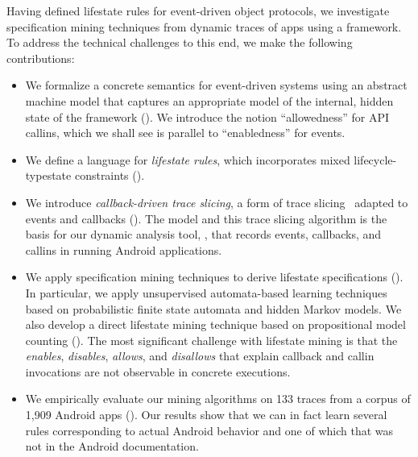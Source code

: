 \documentclass[10pt,reprint,nocopyrightspace,numbers]{sigplanconf}
\begin{document}

Having defined lifestate rules for event-driven object protocols, we investigate specification mining techniques from dynamic traces of apps using a framework. To address the technical challenges to this end, we make the following contributions:
\begin{itemize}\itemsep 0pt
  \item We formalize a concrete semantics for event-driven systems using an abstract machine model \semname that captures an appropriate model of the internal, hidden state of the framework (). We introduce the notion ``allowedness'' for API callins, which we shall see is parallel to ``enabledness'' for events.
  \item We define a language for \emph{lifestate rules}, which incorporates mixed lifecycle-typestate constraints ().
  \item We introduce \emph{callback-driven trace slicing}, a form of trace slicing~\cite{DBLP:conf/tacas/ChenR09} adapted to events and callbacks
(). 
The \semname{} model and this trace slicing algorithm is the basis for our dynamic analysis tool, \toolname, that records events, callbacks, and callins in running Android applications.
  \item We apply specification mining techniques to derive lifestate specifications (). In particular, we apply unsupervised automata-based learning techniques based on probabilistic finite state automata
and hidden Markov models.
We also develop a direct lifestate mining technique based on propositional model counting (\sharpsat). The most significant challenge with lifestate mining is that the \emph{enables}, \emph{disables}, \emph{allows}, and \emph{disallows} that explain callback and callin invocations are not observable in concrete executions.
\item We empirically evaluate our mining algorithms on 133 traces from a corpus of 1,909 Android apps (). Our results show that we can in fact learn several rules corresponding to actual Android behavior and one of which that was not in the Android documentation.
\end{itemize}
\end{document}
